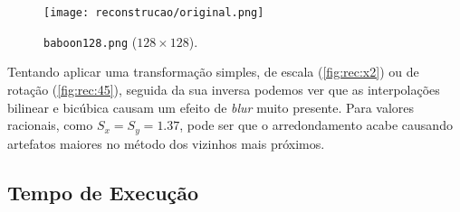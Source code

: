     \begin{figure}[H]
        \centering
        \texttt{[image: reconstrucao/original.png]}
        \caption{\texttt{baboon128.png} ($128 \times 128$).}
        \label{fig:baboon128}
    \end{figure}

    Tentando aplicar uma transformação simples, de escala (\cref{fig:rec:x2}) ou de rotação (\cref{fig:rec:45}), seguida da sua inversa podemos ver que as interpolações bilinear e bicúbica causam um efeito de \textit{blur} muito presente. Para valores racionais, como $S_x = S_y = 1.37$, pode ser que o arredondamento acabe causando artefatos maiores no método dos vizinhos mais próximos.

    

    

\subsection{Tempo de Execução}
